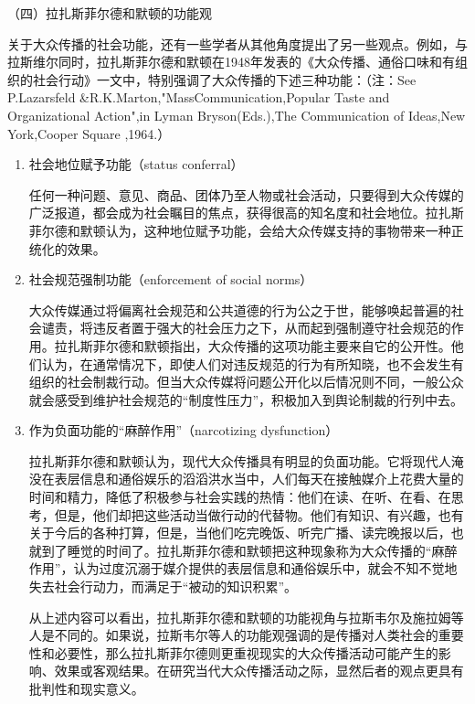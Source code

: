 \documentclass[UTF8,12pt]{ctexart}
\numberwithin{equation}{section} %
\numberwithin{figure}{section}
\numberwithin{table}{section}
\begin{document}
	（四）拉扎斯菲尔德和默顿的功能观
	
	关于大众传播的社会功能，还有一些学者从其他角度提出了另一些观点。例如，与拉斯维尔同时，拉扎斯菲尔德和默顿在1948年发表的《大众传播、通俗口味和有组织的社会行动》一文中，特别强调了大众传播的下述三种功能：（注：See P.Lazarsfeld \&R.K.Marton,"MassCommunication,Popular Taste and Organizational Action",in Lyman Bryson(Eds.),The Communication of Ideas,New York,Cooper Square ,1964.）
	
	\begin{enumerate}
		\item 社会地位赋予功能（status conferral）
		
		任何一种问题、意见、商品、团体乃至人物或社会活动，只要得到大众传媒的广泛报道，都会成为社会瞩目的焦点，获得很高的知名度和社会地位。拉扎斯菲尔德和默顿认为，这种地位赋予功能，会给大众传媒支持的事物带来一种正统化的效果。
		
		\item 社会规范强制功能（enforcement of social norms）
		
		大众传媒通过将偏离社会规范和公共道德的行为公之于世，能够唤起普遍的社会谴责，将违反者置于强大的社会压力之下，从而起到强制遵守社会规范的作用。拉扎斯菲尔德和默顿指出，大众传播的这项功能主要来自它的公开性。他们认为，在通常情况下，即使人们对违反规范的行为有所知晓，也不会发生有组织的社会制裁行动。但当大众传媒将问题公开化以后情况则不同，一般公众就会感受到维护社会规范的“制度性压力”，积极加入到舆论制裁的行列中去。
		
		\item 作为负面功能的“麻醉作用”（narcotizing dysfunction）
		
		拉扎斯菲尔德和默顿认为，现代大众传播具有明显的负面功能。它将现代人淹没在表层信息和通俗娱乐的滔滔洪水当中，人们每天在接触媒介上花费大量的时间和精力，降低了积极参与社会实践的热情：他们在读、在听、在看、在思考，但是，他们却把这些活动当做行动的代替物。他们有知识、有兴趣，也有关于今后的各种打算，但是，当他们吃完晚饭、听完广播、读完晚报以后，也就到了睡觉的时间了。拉扎斯菲尔德和默顿把这种现象称为大众传播的“麻醉作用”，认为过度沉溺于媒介提供的表层信息和通俗娱乐中，就会不知不觉地失去社会行动力，而满足于“被动的知识积累”。
		
		从上述内容可以看出，拉扎斯菲尔德和默顿的功能视角与拉斯韦尔及施拉姆等人是不同的。如果说，拉斯韦尔等人的功能观强调的是传播对人类社会的重要性和必要性，那么拉扎斯菲尔德则更重视现实的大众传播活动可能产生的影响、效果或客观结果。在研究当代大众传播活动之际，显然后者的观点更具有批判性和现实意义。
	\end{enumerate}
\end{document}
